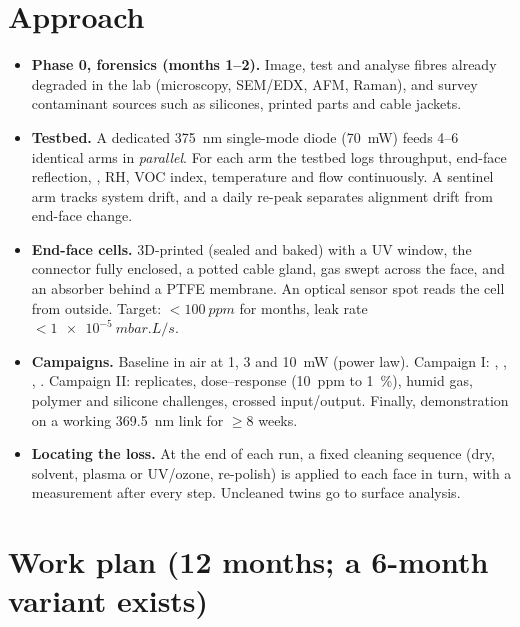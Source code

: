 \begin{center}
\resizebox{0.66\textwidth}{!}{}
\end{center}

\section*{Approach}
\begin{center}
\resizebox{0.97\textwidth}{!}{}
\end{center}
\begin{itemize}
  \item \textbf{Phase 0, forensics (months 1--2).} Image, test and analyse fibres already degraded in the
        lab (microscopy, SEM/EDX, AFM, Raman), and survey contaminant sources such as silicones, printed
        parts and cable jackets.
  \item \textbf{Testbed.} A dedicated \SI{375}{nm} single-mode diode (\SI{70}{mW}) feeds 4--6
        identical arms in \emph{parallel}. For each arm the testbed logs throughput, end-face reflection,
        \Oxy, RH, VOC index, temperature and flow continuously. A sentinel arm tracks system drift, and a
        daily re-peak separates alignment drift from end-face change.
  \item \textbf{End-face cells.} 3D-printed (sealed and baked) with a UV window, the connector fully
        enclosed, a potted cable gland, gas swept across the face, and an absorber behind a PTFE membrane.
        An optical \Oxy{} sensor spot reads the cell from outside. Target: $<\SI{100}{ppm}$ \Oxy{} for months,
        leak rate $<\SI{1e-5}{mbar.L/s}$.
  \item \textbf{Campaigns.} Baseline in air at 1, 3 and \SI{10}{mW} (power law). Campaign I: ,
        , , . Campaign II: replicates, \Oxy{} dose--response (10~ppm to
        \SI{1}{\percent}), humid gas, polymer and silicone challenges, crossed input/output. Finally,
        demonstration on a working \SI{369.5}{nm} link for $\geq8$ weeks.
  \item \textbf{Locating the loss.} At the end of each run, a fixed cleaning sequence (dry, solvent,
        \Oxy{} plasma or UV/ozone, re-polish) is applied to each face in turn, with a measurement after
        every step. Uncleaned twins go to surface analysis.
\end{itemize}

\section*{Work plan (12 months; a 6-month variant exists)}
\begin{center}
\resizebox{0.9\textwidth}{!}{}
\end{center}

